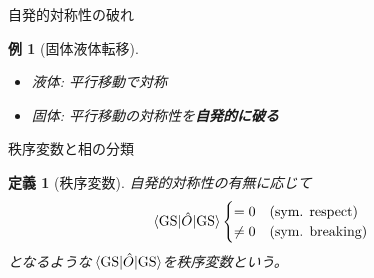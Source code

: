 \documentclass[dvipdfm]{beamer}
\newtheorem*{defn}{定義}
\newtheorem*{exmpl}{例}
\begin{document}
\begin{frame}{自発的対称性の破れ}
    \begin{exmpl}[固体液体転移]
        \begin{itemize}
            \item 液体: 平行移動で対称
            \item 固体: 平行移動の対称性を\textbf{自発的に破る}
        \end{itemize}
        \begin{figure}
            \centering
            \begin{minipage}{0.45\linewidth}
                \centering
            \end{minipage}
            \begin{minipage}{0.45\linewidth}
                \centering
            \end{minipage}
        \end{figure}
    \end{exmpl}
\end{frame}


\begin{frame}{秩序変数と相の分類}
    \begin{defn}[秩序変数]
        自発的対称性の有無に応じて
        \begin{equation*}
            \ev{\hat{O}}{\mathrm{GS}}
            \begin{cases}
                =0 & (\text{sym. respect})
                \\
                \neq0 & (\text{sym. breaking})
            \end{cases}
        \end{equation*}
        となるような$\ev{\hat{O}}{\mathrm{GS}}$を秩序変数という。
    \end{defn}
    \begin{example}[固体液体転移]
    \end{example}
\end{frame}
\end{document}
